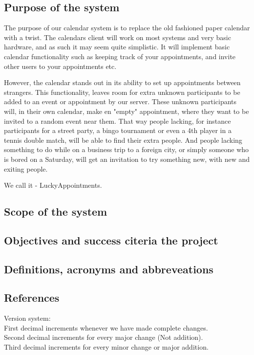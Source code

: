\subsection{Purpose of the system}
		The purpose of our calendar system is to replace the old fashioned paper calendar with a twist. The calendars client will work on most systems and very basic hardware, and as such it may seem quite simplistic. It will implement basic calendar functionality such as keeping track of your appointments, and invite other users to your appointments etc. 

		However, the calendar stands out in its ability to set up appointments between strangers. This functionality, leaves room for extra unknown participants to be added to an event or appointment by our server. These unknown participants will, in their own calendar, make en "empty" appointment, where they want to be invited to a random event near them. That way people lacking, for instance participants for a street party, a bingo tournament or even a 4th player in a tennis double match, will be able to find their extra people. And people lacking something to do while on a business trip to a foreign city, or simply someone who is bored on a Saturday, will get an invitation to try something new, with new and exiting people.

		We call it - LuckyAppointments.

\subsection{Scope of the system}

\subsection{Objectives and success citeria the project}

\subsection{Definitions, acronyms and abbreveations}

\subsection{References}


Version system:\\
First decimal increments whenever we have made complete changes. \\
Second decimal increments for every major change (Not addition).   \\
Third decimal increments for every minor change or major addition.\\

